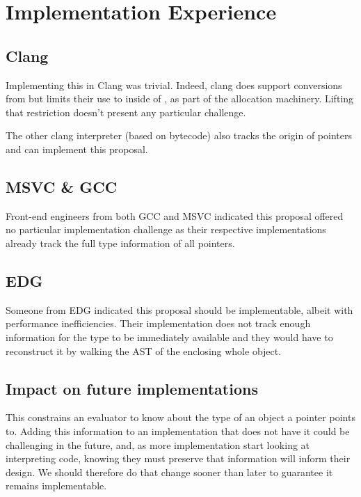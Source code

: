 \documentclass{wg21}
\begin{document}
    \section{Implementation Experience}

    \subsection{Clang}

    Implementing this in Clang was trivial. Indeed, clang does support  conversions from  but limits their use to inside of , as part of the  allocation machinery. Lifting that restriction doesn't present any particular challenge.

    The other clang  interpreter (based on bytecode) also tracks the origin of pointers and can implement this proposal.

    \subsection{MSVC \& GCC}

    Front-end engineers from both GCC and MSVC indicated this proposal offered no particular implementation challenge as their respective implementations already track the full type information of all pointers.

    \subsection{EDG}

    Someone from EDG indicated this proposal should be implementable, albeit with performance inefficiencies. Their implementation does not track enough information for the type to be immediately available and they would have to reconstruct it by walking the AST of the enclosing whole object.


    \subsection{Impact on future implementations}

    This constrains an evaluator to know about the type of an object a pointer points to.
    Adding this information to an implementation that does not have it could be challenging in the future, and, as more implementation start looking at
    interpreting  code, knowing they must preserve that information will inform their design. We should therefore do that change sooner than later to guarantee it remains implementable.
\end{document}
